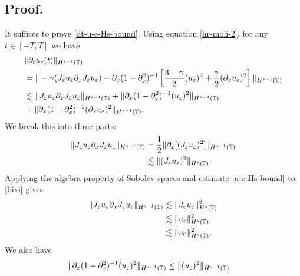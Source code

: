 	\subsection{ Proof.}  It suffices to prove  \eqref{dt-u-e-Hs-bound}.
	Using equation \eqref{hr-moli-2}, for any $t\in [-T, T]$ we have
	\begin{equation*}
		\begin{split}
			& \| \partial_t u_\varepsilon(t) \|_{H^{s-1}(\mathbb{T})}  
			\\
			& = 
			\| -\gamma (J_\varepsilon u_\varepsilon \partial_x  J_\varepsilon  u_\varepsilon) -
			\partial_x (1-\partial_x^2)^{-1} \left [\frac{3-\gamma}{2} (u_\varepsilon)^2 +
			\frac{\gamma}{2}(\partial_x u_\varepsilon)^2 \right ] \|_{H^{s-1}(\mathbb{T})}
			\\
			& \lesssim  
			\| J_\varepsilon u_\varepsilon \partial_x  J_\varepsilon  u_\varepsilon \|_{H^{s-1}(\mathbb{T})}
			+ \|\partial_x (1-\partial_x^2)^{-1} (u_\varepsilon)^2 \|_{H^{s-1}(\mathbb{T})}
			\\
			& + \| \partial_x (1-\partial_x^2)^{-1}(\partial_x u_\varepsilon)^2\|_{H^{s-1}(\mathbb{T})}.
			\end{split}
		\end{equation*}
		We break this into three parts:
		\begin{equation}
			\label{bixi}
			\begin{split}
				\| J_\varepsilon u_\varepsilon \partial_x J_\varepsilon u_\varepsilon \|_{H^{s-1}(\mathbb{T})}
				& = 
				\frac{1}{2}\|\partial_x[(J_\varepsilon u_\varepsilon
				)^2]\|_{H^{s-1}(\mathbb{T})}
				\\
				& \lesssim \|(J_\varepsilon u_\varepsilon )^2\|_{H^s(\mathbb{T})}.
			\end{split}
		\end{equation}
		Applying the algebra property of Sobolev spaces and estimate
		\eqref{u-e-Hs-bound} to \eqref{bixi} gives 
		\begin{equation}
			\label{deriv1}
			\begin{split}
				\|J_\varepsilon u_\varepsilon \partial_x J_\varepsilon u_\varepsilon  
				\|_{H^{s-1}(\mathbb{T})}
				& \lesssim
				\|J_\varepsilon u_\varepsilon \|_{H^s(\mathbb{T})}^2
				\\
				&\lesssim
				\| u_\varepsilon \|_{H^s(\mathbb{T})}^2
				\\
				&\lesssim
				\|u_0\|_{H^s(\mathbb{T})}^2.
			\end{split}
		\end{equation}
		We also have
		\begin{equation*}
			\begin{split}
				\|\partial_x (1-\partial_x^2)^{-1} (u_\varepsilon)^2\|_{H^{s-1}(\mathbb{T})}
				& \le \| (u_\varepsilon)^2\|_{H^{s-1}(\mathbb{T})}
				\end{split}
		\end{equation*}
